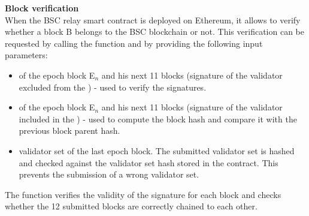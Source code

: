 \noindent
\textbf{Block verification}\\
When the BSC relay smart contract is deployed on Ethereum, it allows to verify whether a block B belongs to the BSC blockchain or not. This verification can be requested by calling the \verify function and by providing the following input parameters:
\begin{itemize}
    \item \rlph of the epoch block E$_n$ and his next 11 blocks (signature of the validator excluded from the \rlph) - used to verify the signatures. 
    \item \rlph of the epoch block E$_n$ and his next 11 blocks (signature of the validator included in the \rlph) - used to compute the block hash and compare it with the previous block parent hash.
    \item validator set of the last epoch block. The submitted validator set is hashed and checked against the validator set hash stored in the contract. This prevents the submission of a wrong validator set.
\end{itemize}
The \verify function verifies the validity of the signature for each block and checks whether the 12 submitted blocks are correctly chained to each other.
